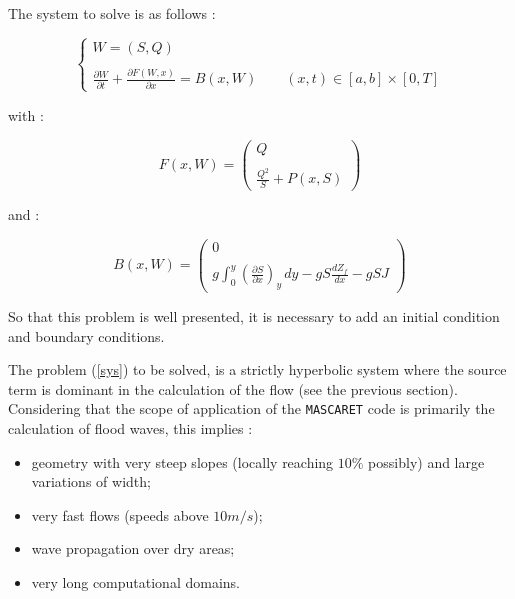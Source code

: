 \hspace*{1cm}

The system to solve is as follows :

\begin{equation}
   \label{sys}
   \left \lbrace
  \begin{array}{l}
   W = (S,Q) \\
   \\
   \frac{\partial W}{\partial t} + \frac{\partial F(W,x)}{\partial x} = B(x,W) \qquad (x,t) \in [a,b] \times [0,T] 
  \end{array}
 \right.
\end{equation}

with : 

\begin{equation}
 F(x,W) = \left ( \begin{array}{c}
    Q\\
    \\
    \frac{Q^2}{S} + P(x,S)
\end{array}
\right )
\end{equation}

and :

\begin{equation}
 B(x,W) = \left ( \begin{array}{c}
    0\\
    \\
    g \int_{0}^y \left ( \frac{\partial S}{\partial x} \right )_y \, dy - g S \frac{dZ_f}{dx} - g S J
\end{array}
\right )
\end{equation}

\vspace{0.5cm}

So that this problem is well presented, it is necessary to add an initial condition and boundary conditions.

\vspace{0.5cm}

The problem (\ref{sys}) to be solved, is a strictly hyperbolic system where the source term is dominant in the calculation of the flow (see the previous section).
Considering that the scope of application of the \texttt{MASCARET} code is primarily the calculation of flood waves, this implies :
\begin{itemize}
 \item geometry with very steep slopes (locally reaching $10\%$ possibly) and large variations of width;
 \item very fast flows (speeds above $10 m/s$);
 \item wave propagation over dry areas;
 \item very long computational domains.
\end{itemize}

